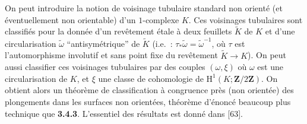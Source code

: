 On peut introduire la notion de voisinage tubulaire standard non orienté (et éventuellement non orientable) d'un $1$-complexe $K$. Ces voisinages tubulaires sont classifiés pour la donnée d'un revêtement étale à deux feuillets $\tilde{K}$ de $K$ et d'une circularisation $\tilde{\omega}$ ``antisymétrique'' de $\tilde{K}$ (i.e.~: $\tau_* \tilde{\omega} = \tilde{\omega}^{-1}$, où $\tau$ est l'automorphisme involutif et sans point fixe du revêtement $\widetilde{K} \to K$). On peut aussi classifier ces voisinages tubulaires par des couples $(\omega, \xi)$ où $\omega$ est une circularisation de $K$, et $\xi$ une classe de cohomologie de $\mathrm{H}^1(K; \mathbf{Z}/2\mathbf{Z})$. On obtient alors un théorème de classification à congruence près (non orientée) des plongements dans les surfaces non orientées, théorème d'énoncé beaucoup plus technique que {\bf 3.4.3}. L'essentiel des résultats est donné dans [63].


